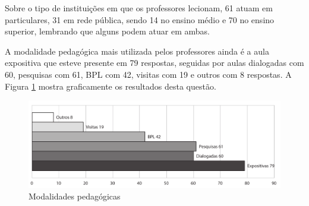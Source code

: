 Sobre o tipo de instituições em que os professores lecionam, 61 atuam em particulares, 31 em rede pública, sendo 14 no ensino médio e 70 no ensino superior, lembrando que alguns podem atuar em ambas. 

 



A modalidade pedagógica mais utilizada pelos professores ainda é a aula expositiva que esteve presente em 79 respostas, seguidas por aulas dialogadas com 60, pesquisas com 61, BPL com 42, visitas com 19 e outros com 8 respostas. A Figura \ref{fig:grafico_modalidade} mostra graficamente os resultados desta questão. 


 
\begin{figure}[!h]
\centering
\includegraphics[width=1.0\textwidth]{pdfs/professores/img-grafico-modalidade.pdf} 
\caption{Modalidades pedagógicas}
\label{fig:grafico_modalidade} 
\end{figure}


